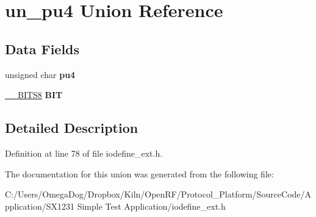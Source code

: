 \hypertarget{unionun__pu4}{\section{un\-\_\-pu4 Union Reference}
\label{unionun__pu4}
}
\subsection*{Data Fields}
\begin{DoxyCompactItemize}
\item 
\hypertarget{unionun__pu4_a0fb04c24295140eab5b18cf5ea816624}{unsigned char {\bfseries pu4}}\label{unionun__pu4_a0fb04c24295140eab5b18cf5ea816624}

\item 
\hypertarget{unionun__pu4_a347ea399b9d2bbc965eae1159f4a6fc4}{\hyperlink{struct_____b_i_t_s8}{\-\_\-\-\_\-\-B\-I\-T\-S8} {\bfseries B\-I\-T}}\label{unionun__pu4_a347ea399b9d2bbc965eae1159f4a6fc4}

\end{DoxyCompactItemize}


\subsection{Detailed Description}


Definition at line 78 of file iodefine\-\_\-ext.\-h.



The documentation for this union was generated from the following file\-:\begin{DoxyCompactItemize}
\item 
C\-:/\-Users/\-Omega\-Dog/\-Dropbox/\-Kiln/\-Open\-R\-F/\-Protocol\-\_\-\-Platform/\-Source\-Code/\-Application/\-S\-X1231 Simple Test Application/iodefine\-\_\-ext.\-h\end{DoxyCompactItemize}
